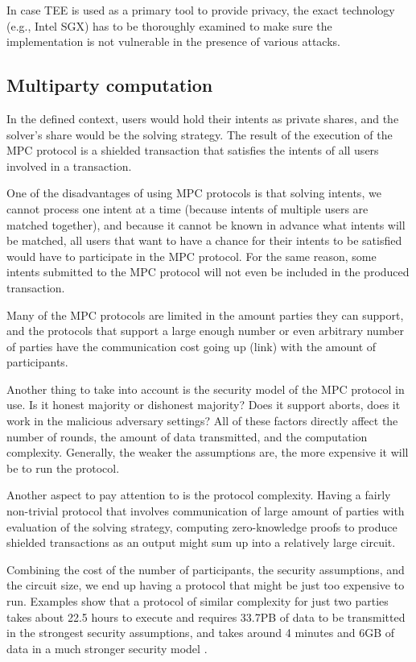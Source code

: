 \documentclass[
    9pt,            %
    report,        %
    affiltop,       %
]{art}
\begin{document}
In case TEE is used as a primary tool to provide privacy, the exact technology
(e.g., Intel SGX) has to be thoroughly examined to make sure the implementation
is not vulnerable in the presence of various attacks.

\subsection{Multiparty computation}

In the defined context, users would hold their intents as private shares, and the solver's share would be the solving strategy. The result of the execution of the MPC protocol is a shielded transaction that satisfies the intents of all users involved in a transaction.

One of the disadvantages of using MPC protocols is that solving intents, we cannot process one intent at a time (because intents of multiple users are matched together), and because it cannot be known in advance what intents will be matched, all users that want to have a chance for their intents to be satisfied would have to participate in the MPC protocol. For the same reason, some intents submitted to the MPC protocol will not even be included in the produced transaction.

Many of the MPC protocols are limited in the amount parties they can support, and the protocols that support a large enough number or even arbitrary number of parties have the communication cost going up (link) with the amount of participants.

Another thing to take into account is the security model of the MPC protocol in use. Is it honest majority or dishonest majority? Does it support aborts, does it work in the malicious adversary settings? All of these factors directly affect the number of rounds, the amount of data transmitted, and the computation complexity. Generally, the weaker the assumptions are, the more expensive it will be to run the protocol.

Another aspect to pay attention to is the protocol complexity. Having a fairly non-trivial protocol that involves communication of large amount of parties with evaluation of the solving strategy, computing zero-knowledge proofs to produce shielded transactions as an output might sum up into a relatively large circuit.

Combining the cost of the number of participants, the security assumptions, and the circuit size, we end up having a protocol that might be just too expensive to run. Examples show that a protocol of similar complexity for just two parties takes about 22.5 hours to execute and requires 33.7PB of data to be transmitted in the strongest security assumptions, and takes around 4 minutes and 6GB of data in a much stronger security model \citep{flash}.
\end{document}
